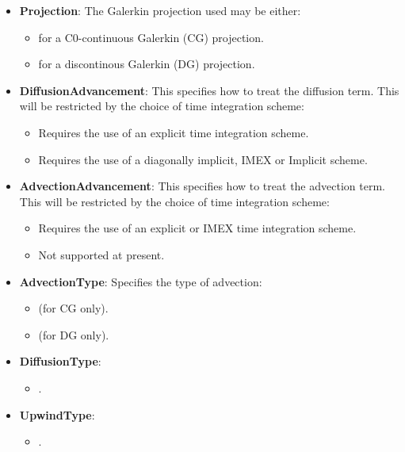\begin{itemize}
\begin{table}[h!]
\begin{center}
\begin{tabular}{|l|c|c|c|c|}
\end{tabular}
\end{center}
\label{t:ADR2}
\end{table}
\vspace{-1 cm}
\item \textbf{Projection}: The Galerkin projection used may be either:
\begin{itemize}
	\item {} for a C0-continuous Galerkin (CG) projection.
	\item {} for a discontinous Galerkin (DG) projection.
\end{itemize}
\item \textbf{DiffusionAdvancement}: This specifies how to treat the diffusion term. This will be restricted by the choice of time integration scheme:
\begin{itemize}
	\item {} Requires the use of an explicit time integration
	scheme.
	\item {} Requires the use of a diagonally implicit, IMEX or
	Implicit scheme.
\end{itemize}
\item \textbf{AdvectionAdvancement}: This specifies how to treat the advection term. This will be restricted by the choice of time integration scheme:
\begin{itemize}
	\item {} Requires the use of an explicit or IMEX time integration
	scheme.
	\item {} Not supported at present.
\end{itemize}
\item \textbf{AdvectionType}: Specifies the type of advection:
\begin{itemize}
	\item {} (for CG only).
	\item {} (for DG only).
\end{itemize}
\item \textbf{DiffusionType}:
\begin{itemize}
	\item {}.
\end{itemize}
\item \textbf{UpwindType}:
\begin{itemize}
	\item {}.
\end{itemize}
\end{itemize}

